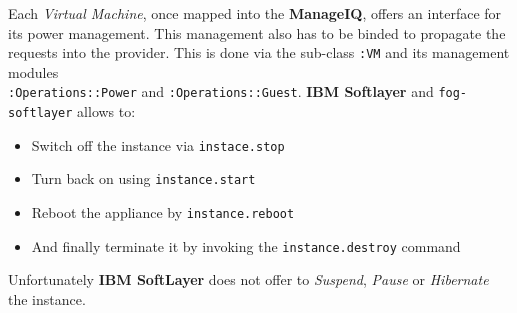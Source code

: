 Each \emph{Virtual Machine}, once mapped into the \textbf{ManageIQ}, offers an interface for its power management. This management also has to be binded to propagate the requests into the provider. This is done via the sub-class \verb|:VM| and its management modules \\ \verb|:Operations::Power| and \verb|:Operations::Guest|. \textbf{IBM Softlayer} and \texttt{fog-softlayer} allows to:

\begin{itemize}
	\item Switch off the instance via \verb|instace.stop|
	\item Turn back on using \verb|instance.start|
	\item Reboot the appliance by \verb|instance.reboot|
	\item And finally terminate it by invoking the \verb|instance.destroy| command
\end{itemize}

Unfortunately \textbf{IBM SoftLayer} does not offer to \emph{Suspend}, \emph{Pause} or \emph{Hibernate} the instance.

